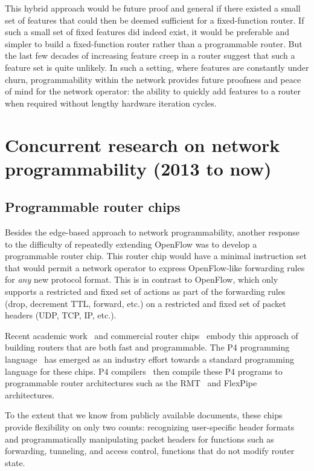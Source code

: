 This hybrid approach would be future proof and general if there existed a small
set of features that could then be deemed sufficient for a fixed-function
router. If such a small set of fixed features did indeed exist, it would be
preferable and simpler to build a fixed-function router rather than a
programmable router. But the last few decades of increasing feature creep in a
router suggest that such a feature set is quite unlikely. In such a setting,
where features are constantly under churn, programmability within the network
provides future proofness and peace of mind for the network operator: the
ability to quickly add features to a router when required without lengthy
hardware iteration cycles.

\section{Concurrent research on network programmability (2013 to now)}
\label{s:concurrent}

\subsection{Programmable router chips}
\label{ss:prog_router_chips}
Besides the edge-based approach to network programmability, another response to
the difficulty of repeatedly extending OpenFlow was to develop a programmable
router chip. This router chip would have a minimal instruction set that would
permit a network operator to express OpenFlow-like forwarding rules for {\em
any} new protocol format. This is in contrast to OpenFlow, which only supports
a restricted and fixed set of actions as part of the forwarding rules (drop,
decrement TTL, forward, etc.) on a restricted and fixed set of packet headers
(UDP, TCP, IP, etc.).

Recent academic work~\cite{rmt} and commercial router chips~\cite{tofino,
flexpipe, xpliant} embody this approach of building routers that are both fast
and programmable. The P4 programming language~\cite{p4} has emerged as an
industry effort towards a standard programming language for these chips.  P4
compilers~\cite{lavanya_compiler} then compile these P4 programs to
programmable router architectures such as the RMT~\cite{rmt} and
FlexPipe~\cite{flexpipe} architectures.

To the extent that we know from publicly available documents, these chips
provide flexibility on only two counts: recognizing user-specific header
formats and programmatically manipulating packet headers for functions such as
forwarding, tunneling, and access control, \ie functions that do not modify
router state.

